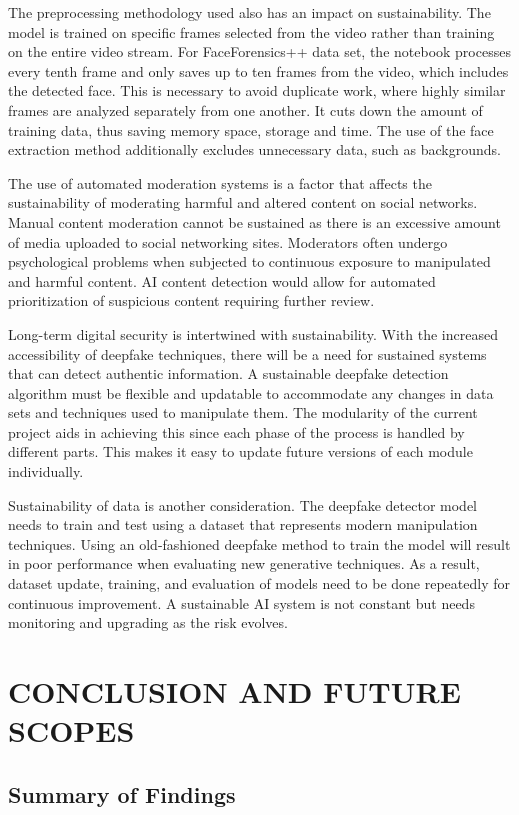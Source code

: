 \documentclass[12pt,a4paper]{report}
\begin{document}
The preprocessing methodology used also has an impact on sustainability. The model is trained on specific frames selected from the video rather than training on the entire video stream. For FaceForensics++ data set, the notebook processes every tenth frame and only saves up to ten frames from the video, which includes the detected face. This is necessary to avoid duplicate work, where highly similar frames are analyzed separately from one another. It cuts down the amount of training data, thus saving memory space, storage and time. The use of the face extraction method additionally excludes unnecessary data, such as backgrounds.

The use of automated moderation systems is a factor that affects the sustainability of moderating harmful and altered content on social networks. Manual content moderation cannot be sustained as there is an excessive amount of media uploaded to social networking sites. Moderators often undergo psychological problems when subjected to continuous exposure to manipulated and harmful content. AI content detection would allow for automated prioritization of suspicious content requiring further review.

Long-term digital security is intertwined with sustainability. With the increased accessibility of deepfake techniques, there will be a need for sustained systems that can detect authentic information. A sustainable deepfake detection algorithm must be flexible and updatable to accommodate any changes in data sets and techniques used to manipulate them. The modularity of the current project aids in achieving this since each phase of the process is handled by different parts. This makes it easy to update future versions of each module individually.

Sustainability of data is another consideration. The deepfake detector model needs to train and test using a dataset that represents modern manipulation techniques. Using an old-fashioned deepfake method to train the model will result in poor performance when evaluating new generative techniques. As a result, dataset update, training, and evaluation of models need to be done repeatedly for continuous improvement. A sustainable AI system is not constant but needs monitoring and upgrading as the risk evolves.

\chapter{CONCLUSION AND FUTURE SCOPES}
\section{Summary of Findings}
\end{document}
